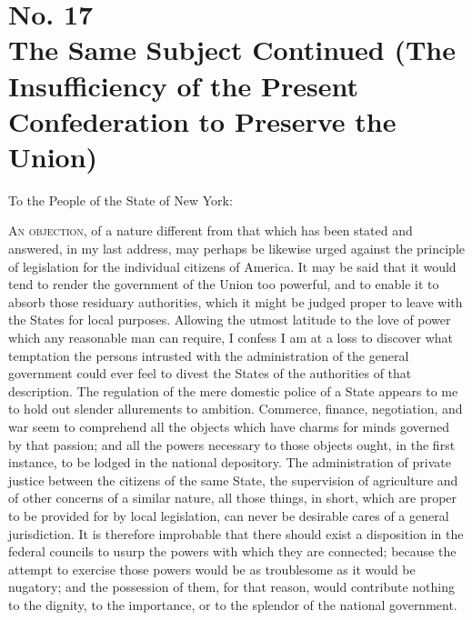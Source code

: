 \chapter[No. 17: The Same Subject Continued (The Insufficiency of the Present Confederation to Preserve the Union)]{No. 17\\ {\small The Same Subject Continued (The Insufficiency of the Present Confederation to Preserve the Union)}}
To the People of the State of New York:
\vspace{.4cm}

\textsc{An objection}, of a nature different from that which has been stated and answered, in my last address, may perhaps be likewise urged against the principle of legislation for the individual citizens of America. It may be said that it would tend to render the government of the Union too powerful, and to enable it to absorb those residuary authorities, which it might be judged proper to leave with the States for local purposes. Allowing the utmost latitude to the love of power which any reasonable man can require, I confess I am at a loss to discover what temptation the persons intrusted with the administration of the general government could ever feel to divest the States of the authorities of that description. The regulation of the mere domestic police of a State appears to me to hold out slender allurements to ambition. Commerce, finance, negotiation, and war seem to comprehend all the objects which have charms for minds governed by that passion; and all the powers necessary to those objects ought, in the first instance, to be lodged in the national depository. The administration of private justice between the citizens of the same State, the supervision of agriculture and of other concerns of a similar nature, all those things, in short, which are proper to be provided for by local legislation, can never be desirable cares of a general jurisdiction. It is therefore improbable that there should exist a disposition in the federal councils to usurp the powers with which they are connected; because the attempt to exercise those powers would be as troublesome as it would be nugatory; and the possession of them, for that reason, would contribute nothing to the dignity, to the importance, or to the splendor of the national government.

